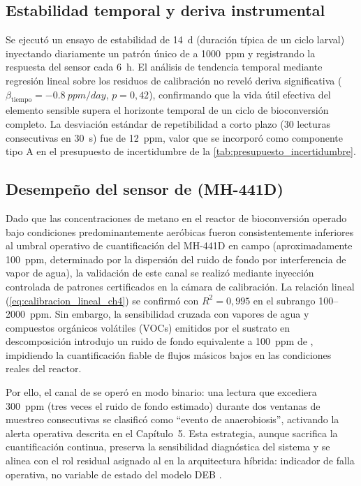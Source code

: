 \subsection{Estabilidad temporal y deriva instrumental}
\label{subsec:cap2_resultados_estabilidad}

Se ejecutó un ensayo de estabilidad de \SI{14}{\day} (duración típica de un ciclo larval) inyectando diariamente un patrón único de  a \SI{1000}{ppm} y registrando la respuesta del sensor cada \SI{6}{\hour}. El análisis de tendencia temporal mediante regresión lineal sobre los residuos de calibración no reveló deriva significativa ($\beta_{\text{tiempo}} = -\SI{0.8}{ppm/day}$, $p = 0{,}42$), confirmando que la vida útil efectiva del elemento sensible supera el horizonte temporal de un ciclo de bioconversión completo. La desviación estándar de repetibilidad a corto plazo (30 lecturas consecutivas en \SI{30}{\second}) fue de \SI{12}{ppm}, valor que se incorporó como componente tipo A en el presupuesto de incertidumbre de la \cref{tab:presupuesto_incertidumbre}.

\subsection{Desempeño del sensor de  (MH-441D)}
\label{subsec:cap2_resultados_ch4}

Dado que las concentraciones de metano en el reactor de bioconversión operado bajo condiciones predominantemente aeróbicas fueron consistentemente inferiores al umbral operativo de cuantificación del MH-441D en campo (aproximadamente \SI{100}{ppm}, determinado por la dispersión del ruido de fondo por interferencia de vapor de agua), la validación de este canal se realizó mediante inyección controlada de patrones certificados en la cámara de calibración. La relación lineal (\cref{eq:calibracion_lineal_ch4}) se confirmó con $R^2 = 0{,}995$ en el subrango \num{100}--\num{2000}~ppm. Sin embargo, la sensibilidad cruzada con vapores de agua y compuestos orgánicos volátiles (VOCs) emitidos por el sustrato en descomposición introdujo un ruido de fondo equivalente a \SI{100}{ppm} de , impidiendo la cuantificación fiable de flujos másicos bajos en las condiciones reales del reactor.

Por ello, el canal de  se operó en modo binario: una lectura que excediera \SI{300}{ppm} (tres veces el ruido de fondo estimado) durante dos ventanas de muestreo consecutivas se clasificó como ``evento de anaerobiosis'', activando la alerta operativa descrita en el Capítulo~5. Esta estrategia, aunque sacrifica la cuantificación continua, preserva la sensibilidad diagnóstica del sistema y se alinea con el rol residual asignado al  en la arquitectura híbrida: indicador de falla operativa, no variable de estado del modelo DEB \parencite{rossiEstimatingDynamicsGreenhouse2024a, parodiBioconversionEfficienciesGreenhouse2020a}.

